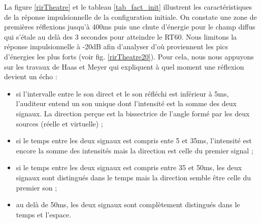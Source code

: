 La figure \ref{rirTheatre} et le tableau \ref{tab_fact_init} illustrent les caractéristiques de la réponse impulsionnelle de la configuration initiale. On constate une zone de premières réflexions jusqu'à 400ms puis une chute d'énergie pour le champ diffus qui s'étale au delà des 3 secondes pour atteindre le \gls{RT60}. Nous limitons la réponse impulsionnelle à -20dB afin d'analyser d'où proviennent les pics d'énergies les plus forts (voir fig. \ref{rirTheatre20}). Pour cela, nous nous appuyons sur les travaux de Haas et Meyer \cite[p.49]{haas} qui expliquent à quel moment une réflexion devient un écho :
\begin{itemize}
\item si l'intervalle entre le son direct et le son réfléchi est inférieur à 5ms, l'auditeur entend un son unique dont l'intensité est la somme des deux signaux. La direction perçue est la bissectrice de l'angle formé par les deux sources (réelle et virtuelle) ;
\item si le temps entre les deux signaux est compris ente 5 et 35ms, l'intensité est encore la somme des intensités mais la direction est celle du premier signal ;
\item si le temps entre les deux signaux est compris entre 35 et 50ms, les deux signaux sont distingués dans le temps mais la direction semble être celle du premier son ;
\item au delà de 50ms, les deux signaux sont complètement distingués dans le temps et l'espace.
\end{itemize}
